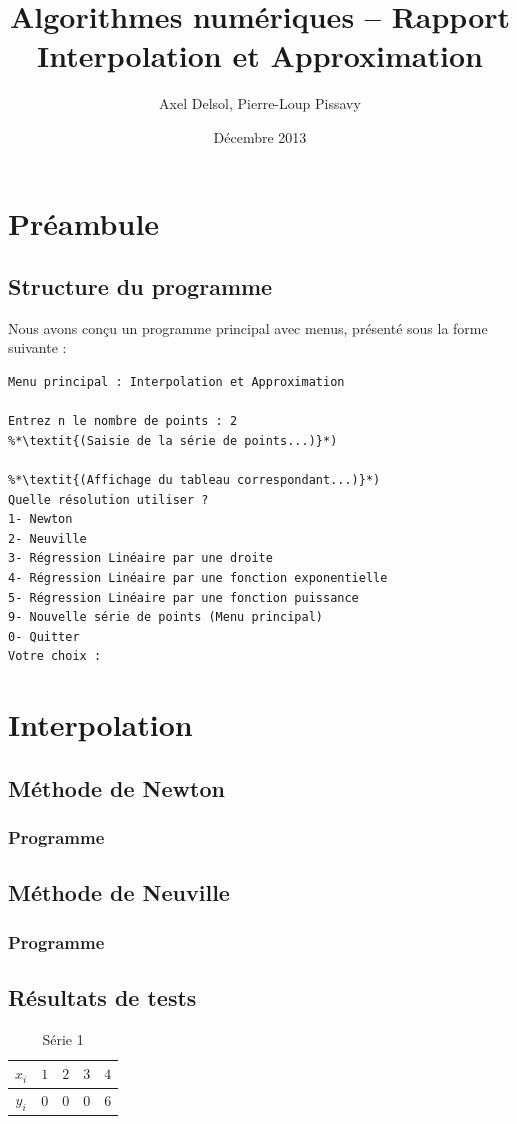 \documentclass{report}
\title{Algorithmes numériques -- Rapport \\ \vspace{0.5cm}Interpolation et Approximation}
\author{Axel Delsol, Pierre-Loup Pissavy}
\date{Décembre 2013}
\begin{document}
  \maketitle
  \tableofcontents

  \chapter{Préambule}
    \section{Structure du programme}
    Nous avons conçu un programme principal avec menus, présenté sous la forme suivante :
    \begin{lstlisting}[style=apercu, name=Menu Principal]
Menu principal : Interpolation et Approximation

Entrez n le nombre de points : 2
%*\textit{(Saisie de la série de points...)}*)

%*\textit{(Affichage du tableau correspondant...)}*)
Quelle résolution utiliser ?
1- Newton
2- Neuville
3- Régression Linéaire par une droite
4- Régression Linéaire par une fonction exponentielle
5- Régression Linéaire par une fonction puissance
9- Nouvelle série de points (Menu principal)
0- Quitter
Votre choix :
    \end{lstlisting}
  \chapter{Interpolation}
    \section{Méthode de Newton}
      \subsection{Programme}
	
	\renewcommand{\arraystretch}{2}
	\renewcommand{\arraystretch}{1}
    \newpage
    \section{Méthode de Neuville}
      \subsection{Programme}
	
    \newpage
    \section{Résultats de tests}
      \begin{table}[h]
	\centering
	\begin{tabular}{| c | c | c | c | c |}
	\hline 
	$x_{i}$ & $1$ & $2$ & $3$ & $4$ \\ 
	\hline 
	$y_{i}$ & $0$ & $0$ & $0$ & $6$ \\ 
	\hline 
	\end{tabular}
	\caption{Série 1}
	\label{inter_td3_ex3}
      \end{table}
\end{document}
